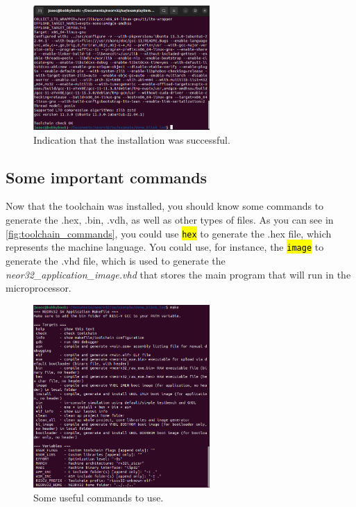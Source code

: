             \begin{figure}[!ht]
                \begin{center}
                    \includegraphics[width= 0.6\textwidth]{figures/successful_check.png}
                    \caption{Indication that the installation was successful.}
                    \label{fig:successful_check}
                \end{center}
            \end{figure}
    
        \subsection{Some important commands}
        
        Now that the toolchain was installed, you should know some commands to generate the .hex, .bin, .vdh, as well as other types of files. As you can see in \autoref{fig:toolchain_commands}, you could use \texttt{\hl{hex}} to generate the .hex file, which represents the machine language. You could use, for instance, the \texttt{\hl{image}} to generate the .vhd file, which is used to generate the \textit{neor32\_application\_image.vhd} that stores the main program that will run in the microprocessor. 
        
        
        \begin{figure}[!ht]
            \begin{center}
                \includegraphics[width= 0.6\textwidth]{figures/toolchain_commands.png}
                \caption{Some useful commands to use.}
                \label{fig:toolchain_commands}
            \end{center}
        \end{figure}
        
